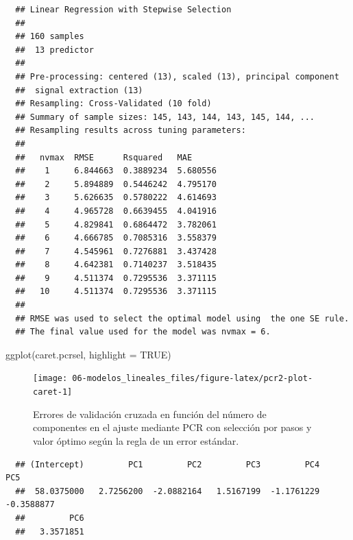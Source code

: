 \documentclass[
]{book}
\newenvironment{Shaded}{\begin{snugshade}}{\end{snugshade}}
\newcommand{\AttributeTok}[1]{\textcolor[rgb]{0.77,0.63,0.00}{#1}}
\newcommand{\ConstantTok}[1]{\textcolor[rgb]{0.00,0.00,0.00}{#1}}
\newcommand{\FunctionTok}[1]{\textcolor[rgb]{0.00,0.00,0.00}{#1}}
\newcommand{\NormalTok}[1]{#1}
\newcommand{\SpecialCharTok}[1]{\textcolor[rgb]{0.00,0.00,0.00}{#1}}
\theoremstyle{break}
\theoremstyle{nonumberplain}
\begin{document}
\begin{verbatim}
  ## Linear Regression with Stepwise Selection 
  ## 
  ## 160 samples
  ##  13 predictor
  ## 
  ## Pre-processing: centered (13), scaled (13), principal component
  ##  signal extraction (13) 
  ## Resampling: Cross-Validated (10 fold) 
  ## Summary of sample sizes: 145, 143, 144, 143, 145, 144, ... 
  ## Resampling results across tuning parameters:
  ## 
  ##   nvmax  RMSE      Rsquared   MAE     
  ##    1     6.844663  0.3889234  5.680556
  ##    2     5.894889  0.5446242  4.795170
  ##    3     5.626635  0.5780222  4.614693
  ##    4     4.965728  0.6639455  4.041916
  ##    5     4.829841  0.6864472  3.782061
  ##    6     4.666785  0.7085316  3.558379
  ##    7     4.545961  0.7276881  3.437428
  ##    8     4.642381  0.7140237  3.518435
  ##    9     4.511374  0.7295536  3.371115
  ##   10     4.511374  0.7295536  3.371115
  ## 
  ## RMSE was used to select the optimal model using  the one SE rule.
  ## The final value used for the model was nvmax = 6.
\end{verbatim}

\begin{Shaded}
\begin{Highlighting}[]
\FunctionTok{ggplot}\NormalTok{(caret.pcrsel, }\AttributeTok{highlight =} \ConstantTok{TRUE}\NormalTok{)}
\end{Highlighting}
\end{Shaded}

\begin{figure}[!htb]

{\centering \texttt{[image: 06-modelos\_lineales\_files/figure-latex/pcr2-plot-caret-1]} 

}

\caption{Errores de validación cruzada en función del número de componentes en el ajuste mediante PCR con selección por pasos y valor óptimo según la regla de un error estándar.}\label{fig:pcr2-plot-caret}
\end{figure}

\begin{Shaded}
\end{Shaded}

\begin{verbatim}
  ## (Intercept)         PC1         PC2         PC3         PC4         PC5 
  ##  58.0375000   2.7256200  -2.0882164   1.5167199  -1.1761229  -0.3588877 
  ##         PC6 
  ##   3.3571851
\end{verbatim}
\end{document}
